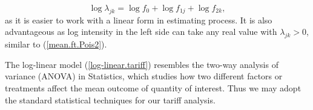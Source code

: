 \documentclass[12pt]{article}
\begin{document}
\begin{equation}
\label{log-linear.tariff}
\log \lambda_{jk}= \log f_0 + \log f_{1j} + \log f_{2k}, 
\end{equation} as it is easier to work with a linear form in estimating process. It is also advantageous as log intensity in the left side can take any real value with $\lambda_{jk}>0$, similar to (\ref{mean.ft.Pois2}).

The log-linear model (\ref{log-linear.tariff}) resembles the two-way analysis of variance (ANOVA) in Statistics, which studies how two different factors or treatments affect the mean outcome of quantity of interest. Thus we may adopt the standard statistical techniques for our tariff analysis. 


\end{document}
